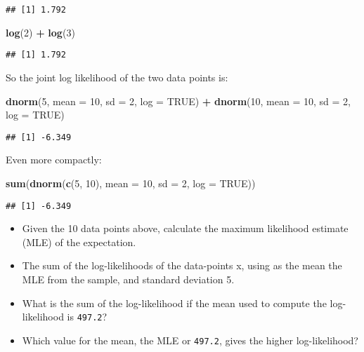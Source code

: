 \documentclass[12pt,]{krantz}
\newenvironment{Shaded}{\begin{snugshade}}{\end{snugshade}}
\newcommand{\DataTypeTok}[1]{\textcolor[rgb]{0.13,0.29,0.53}{#1}}
\newcommand{\DecValTok}[1]{\textcolor[rgb]{0.00,0.00,0.81}{#1}}
\newcommand{\KeywordTok}[1]{\textcolor[rgb]{0.13,0.29,0.53}{\textbf{#1}}}
\newcommand{\NormalTok}[1]{#1}
\newcommand{\OperatorTok}[1]{\textcolor[rgb]{0.81,0.36,0.00}{\textbf{#1}}}
\newcommand{\OtherTok}[1]{\textcolor[rgb]{0.56,0.35,0.01}{#1}}
\newcommand{\StringTok}[1]{\textcolor[rgb]{0.31,0.60,0.02}{#1}}
\providecommand{\tightlist}{%
  \setlength{\itemsep}{0pt}\setlength{\parskip}{0pt}}
\begin{document}
\begin{verbatim}
## [1] 1.792
\end{verbatim}

\begin{Shaded}
\begin{Highlighting}[]
\KeywordTok{log}\NormalTok{(}\DecValTok{2}\NormalTok{) }\OperatorTok{+}\StringTok{ }\KeywordTok{log}\NormalTok{(}\DecValTok{3}\NormalTok{)}
\end{Highlighting}
\end{Shaded}

\begin{verbatim}
## [1] 1.792
\end{verbatim}

So the joint log likelihood of the two data points is:

\begin{Shaded}
\begin{Highlighting}[]
\KeywordTok{dnorm}\NormalTok{(}\DecValTok{5}\NormalTok{, }\DataTypeTok{mean =} \DecValTok{10}\NormalTok{, }\DataTypeTok{sd =} \DecValTok{2}\NormalTok{, }\DataTypeTok{log =} \OtherTok{TRUE}\NormalTok{) }\OperatorTok{+}\StringTok{ }
\StringTok{  }\KeywordTok{dnorm}\NormalTok{(}\DecValTok{10}\NormalTok{, }\DataTypeTok{mean =} \DecValTok{10}\NormalTok{, }\DataTypeTok{sd =} \DecValTok{2}\NormalTok{, }\DataTypeTok{log =} \OtherTok{TRUE}\NormalTok{)}
\end{Highlighting}
\end{Shaded}

\begin{verbatim}
## [1] -6.349
\end{verbatim}

Even more compactly:

\begin{Shaded}
\begin{Highlighting}[]
\KeywordTok{sum}\NormalTok{(}\KeywordTok{dnorm}\NormalTok{(}\KeywordTok{c}\NormalTok{(}\DecValTok{5}\NormalTok{, }\DecValTok{10}\NormalTok{), }\DataTypeTok{mean =} \DecValTok{10}\NormalTok{, }\DataTypeTok{sd =} \DecValTok{2}\NormalTok{, }\DataTypeTok{log =} \OtherTok{TRUE}\NormalTok{))}
\end{Highlighting}
\end{Shaded}

\begin{verbatim}
## [1] -6.349
\end{verbatim}

\begin{itemize}
\tightlist
\item
  Given the 10 data points above, calculate the maximum likelihood estimate (MLE) of the expectation.
\item
  The sum of the log-likelihoods of the data-points x, using as the mean the MLE from the sample, and standard deviation 5.
\item
  What is the sum of the log-likelihood if the mean used to compute the log-likelihood is \texttt{497.2}?
\item
  Which value for the mean, the MLE or \texttt{497.2}, gives the higher log-likelihood?
\end{itemize}
\end{document}
